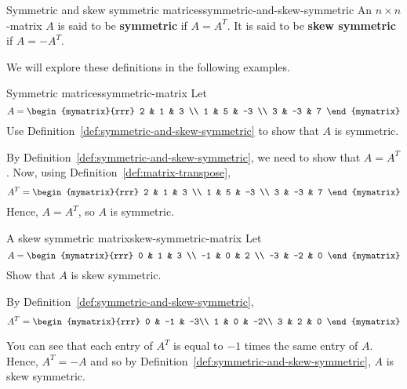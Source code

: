 \begin{definition}{Symmetric and skew symmetric
    matrices}{symmetric-and-skew-symmetric}
  An $n\times n$-matrix $A$ is said to be
  \textbf{symmetric} if $A=A^{T}$. It is said
  to be \textbf{skew symmetric} if
  $A=-A^{T}$.
\end{definition}

We will explore these definitions in the following examples.

\begin{example}{Symmetric matrices}{symmetric-matrix}
  Let
  \begin{equation*}
    A=\begin{mymatrix}{rrr}
      2 & 1 & 3 \\
      1 & 5 & -3 \\
      3 & -3 & 7
    \end{mymatrix} 
  \end{equation*}
  Use Definition~\ref{def:symmetric-and-skew-symmetric} to show that
  $A$ is symmetric.
\end{example}

\begin{solution}
  By Definition~\ref{def:symmetric-and-skew-symmetric}, we need to
  show that $A = A^T$.  Now, using Definition~\ref{def:matrix-transpose},
  \begin{equation*}
    A^{T} = \begin{mymatrix}{rrr}
      2 & 1 & 3 \\
      1 & 5 & -3 \\
      3 & -3 & 7
    \end{mymatrix}
  \end{equation*}
  Hence, $A = A^{T}$, so $A$ is symmetric.
\end{solution}

\begin{example}{A skew symmetric matrix}{skew-symmetric-matrix}
  Let
  \begin{equation*}
    A=\begin{mymatrix}{rrr}
      0 & 1 & 3 \\
      -1 & 0 & 2 \\
      -3 & -2 & 0
    \end{mymatrix} 
  \end{equation*}
  Show that $A$ is skew symmetric.
\end{example}

\begin{solution} By Definition~\ref{def:symmetric-and-skew-symmetric}, 
  \begin{equation*}
    A^{T} = \begin{mymatrix}{rrr}
      0 & -1 & -3\\
      1 &  0 & -2\\
      3 &  2 &  0
    \end{mymatrix} 
  \end{equation*}

  You can see that each entry of $A^T$ is equal to $-1$ times the same
  entry of $A$.  Hence, $A^{T} = - A$ and so by
  Definition~\ref{def:symmetric-and-skew-symmetric}, $A$ is skew
  symmetric.
\end{solution}
